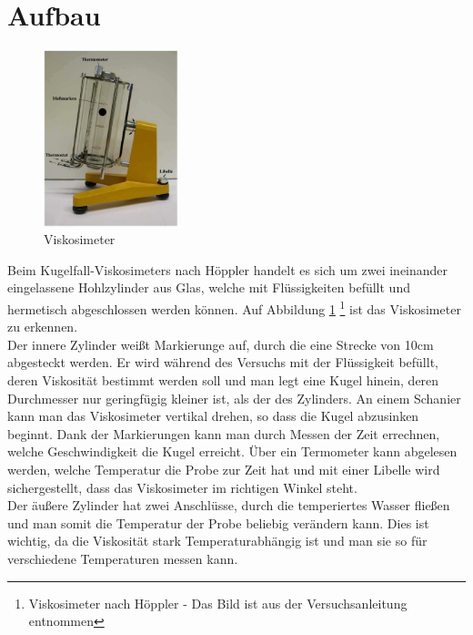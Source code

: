 	\section{Aufbau}
\begin{figure}
	\includegraphics[width=0.35\textwidth]{pics/aufbau.jpg}
	\caption{Viskosimeter}
	\label{aufbau}
\end{figure}

Beim Kugelfall-Viskosimeters nach Höppler handelt es sich um zwei ineinander eingelassene Hohlzylinder aus Glas, welche mit Flüssigkeiten befüllt und hermetisch abgeschlossen werden können. Auf Abbildung \ref{aufbau} \footnote{Viskosimeter nach Höppler - Das Bild ist aus der Versuchsanleitung entnommen} ist das Viskosimeter zu erkennen.\\
Der innere Zylinder weißt Markierunge auf, durch die eine Strecke von 10cm abgesteckt werden. Er wird während des Versuchs mit der Flüssigkeit befüllt, deren Viskosität bestimmt werden soll und man legt eine Kugel hinein, deren Durchmesser nur geringfügig kleiner ist, als der des Zylinders. An einem Schanier kann man das Viskosimeter vertikal drehen, so dass die Kugel abzusinken beginnt. Dank der Markierungen kann man durch Messen der Zeit errechnen, welche Geschwindigkeit die Kugel erreicht.
Über ein Termometer kann abgelesen werden, welche Temperatur die Probe zur Zeit hat und mit einer Libelle wird sichergestellt, dass das Viskosimeter im richtigen Winkel steht.\\
Der äußere Zylinder hat zwei Anschlüsse, durch die temperiertes Wasser fließen und man somit die Temperatur der Probe beliebig verändern kann. Dies ist wichtig, da die Viskosität stark Temperaturabhängig ist und man sie so für verschiedene Temperaturen messen kann. 

